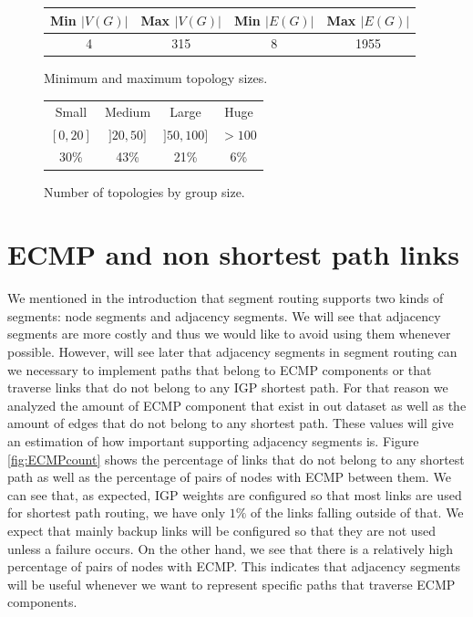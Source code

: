 \begin{figure}
\begin{center}
\begin{tabular}{cccc}
\toprule
Min $|V(G)|$ & Max $|V(G)|$ & Min $|E(G)|$ & Max $|E(G)|$ \\
\midrule
4 & 315 & 8 & 1955 \\
\bottomrule
\end{tabular}
\end{center}
\caption{Minimum and maximum topology sizes.}
\label{fig:sizes}
\end{figure}

\begin{figure}
\begin{center}
\begin{tabular}{cccc}
\toprule
Small & Medium & Large & Huge \\
$[0, 20]$ & $]20, 50]$ & $]50, 100]$ & $> 100$ \\
\midrule
30\% & 43\% & 21\% & 6\% \\
\bottomrule
\end{tabular}
\end{center}
\caption{Number of topologies by group size.}
\label{fig:group_sizes}
\end{figure}

\section{ECMP and non shortest path links}

We mentioned in the introduction that segment routing supports two kinds of segments: node segments 
and adjacency segments. We will see that adjacency segments are more costly and thus we would like to avoid using them whenever possible. However,
will see later that adjacency segments in segment routing can we necessary to implement paths that belong to ECMP components or that traverse
links that do not belong to any IGP shortest path. For that reason we analyzed the amount of ECMP component that exist in out dataset as well
as the amount of edges that do not belong to any shortest path. These values will give an estimation of how important supporting adjacency segments
is. Figure \ref{fig:ECMPcount} shows the percentage of links that do not belong to any shortest path as well as the percentage of pairs
of nodes with ECMP between them. We can see that, as expected, IGP weights are configured so that most links are used for shortest path routing, we
have only $1\%$ of the links falling outside of that.
We expect that mainly backup links will be configured so that they are not used unless a failure occurs. On the other hand, we see that
there is a relatively high percentage of pairs of nodes with ECMP. This indicates that adjacency segments will be useful whenever we want to
represent specific paths that traverse ECMP components. 

